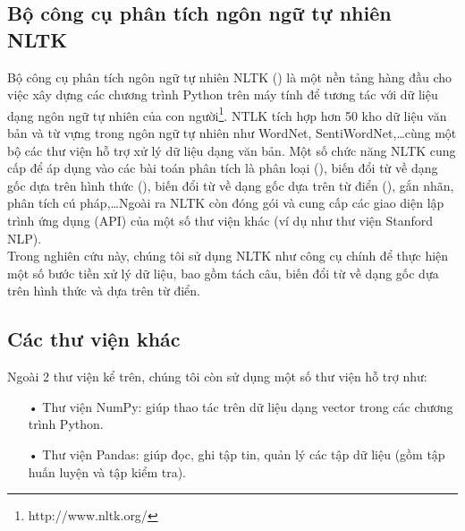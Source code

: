 \subsection*{Bộ công cụ phân tích ngôn ngữ tự nhiên NLTK}
Bộ công cụ phân tích ngôn ngữ tự nhiên NLTK () \cite{bird2009natural} là một nền tảng hàng đầu cho việc xây dựng các chương trình Python trên máy tính để tương tác với dữ liệu dạng ngôn ngữ tự nhiên của con người\footnote{http://www.nltk.org/}. NTLK tích hợp hơn 50 kho dữ liệu văn bản và từ vựng trong ngôn ngữ tự nhiên như WordNet, SentiWordNet,\ldots cùng một bộ các thư viện hỗ trợ xử lý dữ liệu dạng văn bản. Một số chức năng NLTK cung cấp để áp dụng vào các bài toán phân tích là phân loại (), biến đổi từ về dạng gốc dựa trên hình thức (), biến đổi từ về dạng gốc dựa trên từ điển (), gắn nhãn, phân tích cú pháp,\ldots Ngoài ra NLTK còn đóng gói và cung cấp các giao diện lập trình ứng dụng (API) của một số thư viện khác (ví dụ như thư viện Stanford NLP).\\

Trong nghiên cứu này, chúng tôi sử dụng NLTK như công cụ chính để thực hiện một số bước tiền xử lý dữ liệu, bao gồm tách câu, biến đổi từ về dạng gốc dựa trên hình thức và dựa trên từ điển.

\subsection*{Các thư viện khác}
Ngoài 2 thư viện kể trên, chúng tôi còn sử dụng một số thư viện hỗ trợ như:
\begin{itemize}
\item[•] Thư viện NumPy: giúp thao tác trên dữ liệu dạng vector trong các chương trình Python.
\item[•] Thư viện Pandas: giúp đọc, ghi tập tin, quản lý các tập dữ liệu (gồm tập huấn luyện và tập kiểm tra).
\end{itemize}